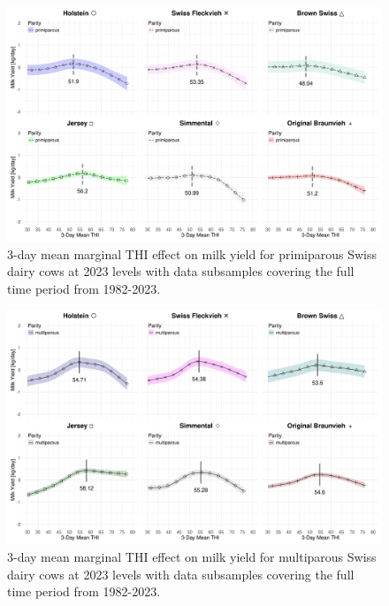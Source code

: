 \begin{figure}[H]
    \centering
    \includegraphics[width=\textwidth]{thesis/figures/results/milk_yield_marginal_primi.png}
    \caption{3-day mean marginal THI effect on milk yield for primiparous Swiss dairy cows at 2023 levels with data subsamples covering the full time period from 1982-2023.}
    \label{fig:results_milk_marginal_parimiprous}
\end{figure}

\begin{figure}[H]
    \centering
    \includegraphics[width=\textwidth]{thesis/figures/results/milk_yield_marginal_multi.png}
    
    \caption{3-day mean marginal THI effect on milk yield for multiparous Swiss dairy cows at 2023 levels with data subsamples covering the full time period from 1982-2023.}
    \label{fig:results_milk_marginal_multiparous}
\end{figure}



